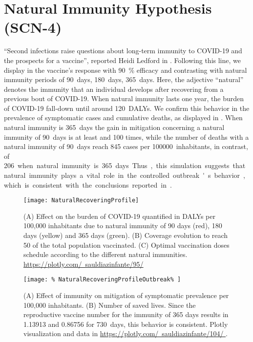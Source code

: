 \section*{Natural Immunity Hypothesis (SCN-4)}
%
``Second infections raise questions about long-term immunity to
COVID-19 and the prospects for a vaccine'',  reported
Heidi Ledford in \cite{Ledford2020b}. Following this line, we
display in  the vaccine's response with
\SI{90}{\percent} efficacy and
contrasting with  natural immunity periods of
\SI{90}{days}, \SI{180}{days}, \SI{365}{days}. Here,
the adjective ``natural'' denotes the immunity that an individual
develops after recovering from a previous bout of COVID-19. When natural
immunity lasts one year, the burden of COVID-19 fall-down until around
\SI{120}{DALYs}. We confirm this behavior in the prevalence of symptomatic
cases and cumulative deaths, as displayed in
. When natural immunity is
\SI{365}{days} the gain in mitigation concerning a natural immunity of
\SI{90}{days} is at least and \num{100} times, while the number of deaths
with a natural immunity of \SI{90}{days} reach \num{845} cases per
\SI{100000}{inhabitants}, in contrast, of \SI{206} when natural immunity is
\SI{365}{days}. Thus, this simulation suggests that natural immunity
plays a vital role in the controlled outbreak's behavior, which is
consistent with the conclusions reported in \cite{Jeyanathan2020}.
%
\begin{figure*}[tbh!]
    \centering
    \texttt{[image: NaturalRecoveringProfile]}
    \caption[Effect of natural immunity on the burden of COVID-19]{
        (A) Effect on the burden of COVID-19 quantified in DALYs per
        100,000 inhabitants due to natural immunity of 90 days (red),
        180 days (yellow) and 365 days (green).
        (B) Coverage evolution to reach \SI{50}{\per} of the total
        population vaccinated.
        (C) Optimal vaccination doses schedule according to the different
        natural immunities.
        \href{https://plotly.com/~sauldiazinfante/95/}{%
            https://plotly.com/~sauldiazinfante/95/}
    }
    \label{fig:natural_recovering_profile}
\end{figure*}
%
\begin{figure*}[h!]
    \centering
    \texttt{[image: \%
        NaturalRecoveringProfileOutbreak\%
    ]}
    \caption[Vaccine induced immunity profile.]{
        (A) Effect of  immunity on mitigation of
        symptomatic prevalence per 100,000 inhabitants.
        (B) Number of saved lives. Since the reproductive vaccine number
        for the immunity of 365 days results in \num{1.13913} and
        \num{0.86756} for \SI{730}{days}, this behavior is consistent.
        Plotly visualization and data in
        \href{https://plotly.com/~sauldiazinfante/104/}{%
            https://plotly.com/~sauldiazinfante/104/
        }.
    }
    \label{fig:natural_recovering_outbreak}
\end{figure*}
